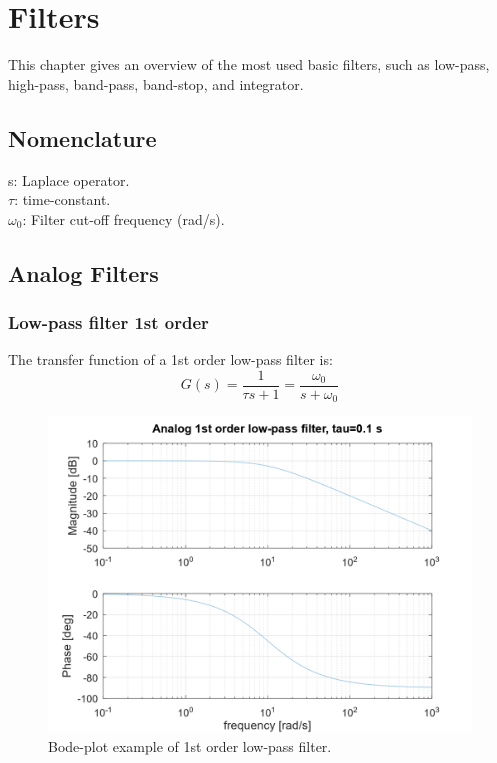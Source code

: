 \documentclass[]{book}
\begin{document}
\hypertarget{filters}{%
\chapter{Filters}\label{filters}}

This chapter gives an overview of the most used basic filters, such as low-pass, high-pass, band-pass, band-stop, and integrator.

\hypertarget{nomenclature}{%
\section{Nomenclature}\label{nomenclature}}

s: Laplace operator.\\
\(\tau\): time-constant.\\
\(\omega_0\): Filter cut-off frequency (rad/s).

\hypertarget{analog-filters}{%
\section{Analog Filters}\label{analog-filters}}

\hypertarget{low-pass-filter-1st-order}{%
\subsection{Low-pass filter 1st order}\label{low-pass-filter-1st-order}}

The transfer function of a 1st order low-pass filter is:
\[
G(s) =  \frac{1}{\tau s + 1} = \frac{\omega_0}{s + \omega_0}
\label{eq:lpf1}
\]

\begin{figure}
\includegraphics[width=1\linewidth]{images/filters/lpf_1st} \caption{Bode-plot example of 1st order low-pass filter.}\label{fig:unnamed-chunk-1}
\end{figure}
\end{document}
